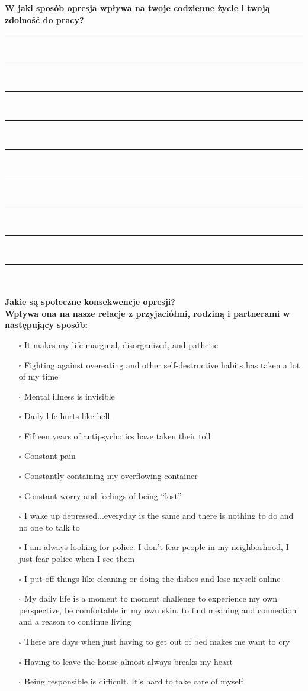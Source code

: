 \newpage
\noindent
\textcolor{ProcessBlue}{\textbf{\Large{W jaki sposób opresja wpływa na twoje codzienne życie i twoją zdolność do pracy?}}}\\
\noindent\rule{\textwidth}{1pt}\\
\noindent\rule{\textwidth}{1pt}\\
\noindent\rule{\textwidth}{1pt}\\
\noindent\rule{\textwidth}{1pt}\\
\noindent\rule{\textwidth}{1pt}\\
\noindent\rule{\textwidth}{1pt}\\
\noindent\rule{\textwidth}{1pt}\\
\noindent\rule{\textwidth}{1pt}\\
\noindent\rule{\textwidth}{1pt}\\\\

\noindent\textcolor{ProcessBlue}{\textbf{\Large{Jakie są społeczne konsekwencje opresji?}}}\\
\textbf{\large{Wpływa ona na nasze relacje z przyjaciółmi, rodziną i partnerami w następujący sposób:}}
\begin{multicols}{2}
\begin{itemize}
\item[$\square$]{It makes my life marginal, disorganized, and pathetic}
\item[$\square$]{Fighting against overeating and other self-destructive habits has taken a lot of my time}
\item[$\square$]{Mental illness is invisible}
\item[$\square$]{Daily life hurts like hell}
\item[$\square$]{Fifteen years of antipsychotics have taken their toll}
\item[$\square$]{Constant pain}
\item[$\square$]{Constantly containing my overflowing container}
\item[$\square$]{Constant worry and feelings of being “lost”}
\item[$\square$]{I wake up depressed...everyday is the same and there is nothing to do and no one to talk to}
\item[$\square$]{I am always looking for police. I don’t fear people in my neighborhood, I just fear police when I see them}
\item[$\square$]{I put off things like cleaning or doing the dishes and lose myself online}
\item[$\square$]{My daily life is a moment to moment challenge to experience my own perspective, be comfortable in my own skin, to find meaning and connection and a reason to continue living}
\item[$\square$]{There are days when just having to get out of bed makes me want to cry}
\item[$\square$]{Having to leave the house almost always breaks my heart}
\item[$\square$]{Being responsible is difficult. It’s hard to take care of myself}
\end{itemize}
\end{multicols}


